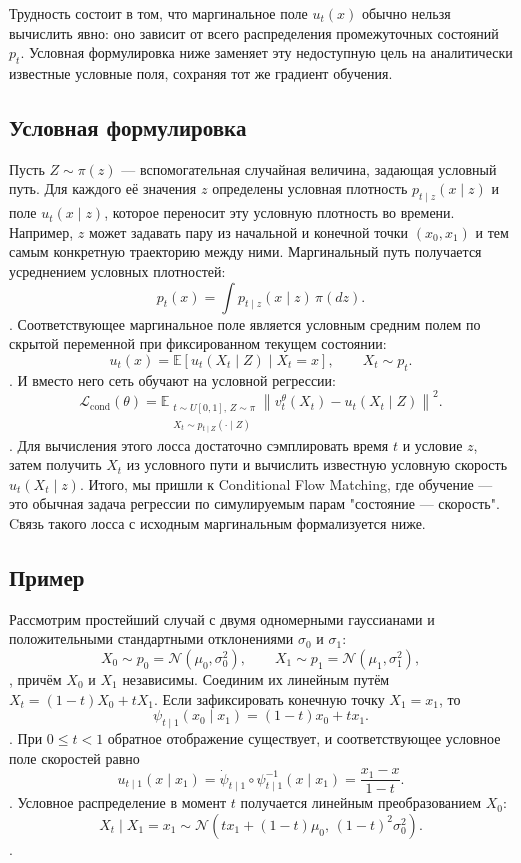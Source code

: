Трудность состоит в том, что маргинальное поле $u_t(x)$ обычно нельзя
вычислить явно: оно зависит от всего распределения промежуточных состояний
$p_t$. Условная формулировка ниже заменяет эту недоступную цель на
аналитически известные условные поля, сохраняя тот же градиент обучения.

\subsection{Условная формулировка}
Пусть $Z\sim\pi(z)$ --- вспомогательная случайная величина, задающая
условный путь. Для каждого её значения $z$ определены условная плотность
$p_{t\mid z}(x\mid z)$ и поле $u_t(x\mid z)$, которое переносит эту
условную плотность во времени. Например, $z$ может задавать пару из начальной
и конечной точки $(x_0,x_1)$ и тем самым конкретную траекторию между ними.
Маргинальный путь получается усреднением условных плотностей:
\[
p_t(x)=\int p_{t\mid z}(x\mid z)\,\pi(dz).
\].
Соответствующее маргинальное поле является условным средним полем по
скрытой переменной при фиксированном текущем состоянии:
\[
u_t(x)=
\mathbb E\!\left[u_t(X_t\mid Z)\mid X_t=x\right],
\qquad X_t\sim p_t.
\].
И вместо него сеть обучают на условной регрессии:
\[
\mathcal L_{\text{cond}}(\theta)=
\mathbb E_{\substack{t\sim U[0,1],\,Z\sim\pi\\
X_t\sim p_{t\mid Z}(\cdot\mid Z)}}
\left\|v_t^\theta(X_t)-u_t(X_t\mid Z)\right\|^2.
\].
Для вычисления этого лосса достаточно сэмплировать время $t$ и условие
$z$, затем получить $X_t$ из условного пути и вычислить известную
условную скорость $u_t(X_t\mid z)$. Итого, мы пришли к Conditional Flow Matching, где обучение
--- это обычная задача регрессии по симулируемым парам "состояние — скорость".
Cвязь такого лосса с исходным маргинальным формализуется ниже.

\subsection{Пример}
\hfill \break
\hfill \break
Рассмотрим простейший случай с двумя одномерными гауссианами и положительными
стандартными отклонениями $\sigma_0$ и $\sigma_1$:
\[
X_0\sim p_0=\mathcal{N}(\mu_0,\sigma_0^2),
\qquad
X_1\sim p_1=\mathcal{N}(\mu_1,\sigma_1^2),
\],
причём $X_0$ и $X_1$ независимы. Соединим их линейным путём
$X_t=(1-t)X_0+tX_1$. Если зафиксировать конечную точку $X_1=x_1$, то
\[
\psi_{t\mid 1}(x_0\mid x_1)=(1-t)x_0+tx_1.
\].
При $0\leq t<1$ обратное отображение существует, и соответствующее
условное поле скоростей равно
\[
u_{t\mid 1}(x\mid x_1)
=\dot\psi_{t\mid 1}\circ\psi_{t\mid 1}^{-1}(x\mid x_1)
=\frac{x_1-x}{1-t}.
\].
Условное распределение в момент $t$ получается линейным преобразованием
$X_0$:
\[
X_t\mid X_1=x_1
\sim\mathcal{N}\!\left(tx_1+(1-t)\mu_0,\,(1-t)^2\sigma_0^2\right).
\].

